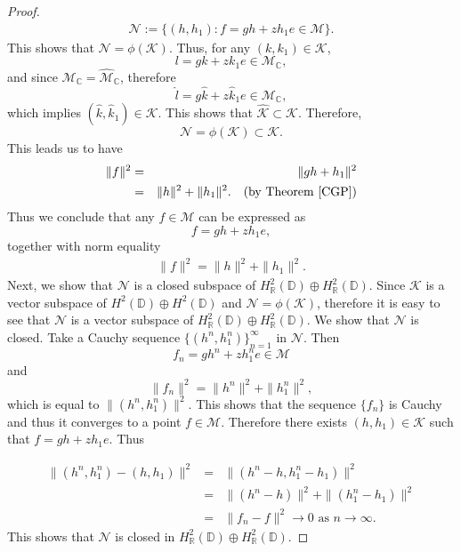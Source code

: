 \documentclass[11pt]{amsart}
\numberwithin{equation}{section}
\begin{document}
\begin{proof}
\begin{eqnarray*}
    \mathcal{N}:=\{(h,h_1): f=gh+zh_1e \in \mathcal{M}\}.
\end{eqnarray*}
This shows that
$\mathcal{N}=\phi(\mathcal{K})$. Thus, for any $(k, k_1) \in \mathcal{K}$, $$l=gk + zk_1e  \in \mathcal{M}_{\mathbb{C}},$$
and since $\mathcal{M}_{\mathbb{C}}=\widehat{\mathcal{M}}_{\mathbb{C}}$, therefore $$\widehat{l}=g\widehat{k} + z\widehat{k}_1e  \in \mathcal{M}_{\mathbb{C}},$$
which implies $(\widehat{k},\widehat{k}_1)\in \mathcal{K}$.
This shows that $\widehat{\mathcal{K}}\subset \mathcal{K}$. Therefore, $$\mathcal{N}=\phi(\mathcal{K})\subset \mathcal{K}.$$ This leads us to have 
\begin{eqnarray*}
    \|f\|^2 &=& \|gh + h_1\|^2\\
    &=& \|h\|^2 + \|h_1\|^2. \quad \text{(by Theorem \ref{CGP})}\\
\end{eqnarray*}
Thus we conclude that any $f\in \mathcal{M}$ can be expressed as $$ f = gh + zh_1e,$$
together with norm equality
\begin{eqnarray*}
    \|f\|^2=\|h\|^2+\|h_1\|^2.
\end{eqnarray*}
Next, we show that $\mathcal{N}$ is a closed subspace of $H^2_{\mathbb{R}}(\mathbb{D}) \oplus H^2_{\mathbb{R}}(\mathbb{D})$. Since $\mathcal{K}$ is a vector subspace of $H^2(\mathbb{D}) \oplus H^2(\mathbb{D})$ and $\mathcal{N}=\phi(\mathcal{K})$, therefore it is easy to see that $\mathcal{N}$ is a vector subspace of $H^2_{\mathbb{R}}(\mathbb{D}) \oplus H^2_{\mathbb{R}}(\mathbb{D})$.
We show that $\mathcal{N}$ is closed. Take a Cauchy sequence $\{(h^n,h^n_1)\}_{n=1}^{\infty}$ in $\mathcal{N}$. Then $$f_n=gh^n + zh^n_1e \in \mathcal{M}$$
and   $$\|f_n\|^2=\|h^n\|^2 + \|h^n_1\|^2,$$ which is equal to $\|(h^n,h^n_1)\|^2$. This shows that the sequence $\{f_n\}$ is Cauchy and thus it converges to a point $f \in \mathcal{M}$. Therefore there exists $(h,h_1) \in \mathcal{K}$ such that $f=gh + zh_1e$. Thus 

\begin{eqnarray*}
\|(h^n,h^n_1)-(h,h_1)\|^2
&=&\|(h^n -h, h^n_1-h_1)\|^2\\
&=&\|(h^n-h)\|^2 + \|(h^n_1-h_1)\|^2\\
&=&\|f_n-f\|^2 \longrightarrow 0 \text{ as } n \longrightarrow \infty.
\end{eqnarray*}
This shows that $\mathcal{N}$ is closed in $H^2_{\mathbb{R}}
(\mathbb{D}) \oplus H_\mathbb{R}^2(\mathbb{D})$.


\end{proof}
\end{document}
